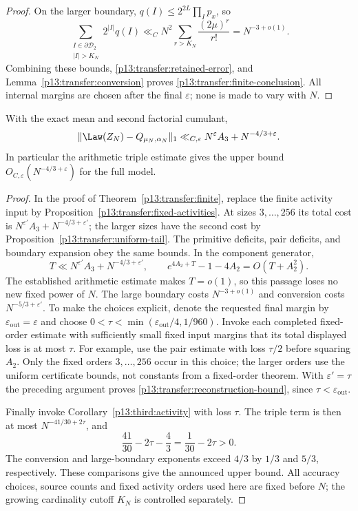 \begin{proof}
On the larger boundary, $q(I)\leq2^{2L}\prod_Ip_x$, so
\[
 \sum_{\substack{I\in\partial\mathscr D_2\\|I|>K_N}}2^{|I|}q(I)
 \ll_C N^2\sum_{r>K_N}\frac{(2\mu)^r}{r!}=N^{-3+o(1)}.
\]
Combining these bounds, \eqref{p13:transfer:retained-error}, and
Lemma~\ref{p13:transfer:conversion} proves
\eqref{p13:transfer:finite-conclusion}. All internal margins are chosen
after the final $\varepsilon$; none is made to vary with $N$.
\end{proof}

\begin{theorem}
\label{p13:transfer:reconstruction}
With the exact mean and second factorial cumulant,
\begin{equation}
 \|\Law(Z_N)-Q_{\mu_N,\alpha_N}\|_1
       \ll_{C,\varepsilon}N^\varepsilon A_3+N^{-4/3+\varepsilon}.
 \label{p13:transfer:reconstruction-bound}
\end{equation}
In particular the arithmetic triple estimate gives the upper bound
$O_{C,\varepsilon}(N^{-4/3+\varepsilon})$ for the full model.
\end{theorem}

\begin{proof}
In the proof of Theorem~\ref{p13:transfer:finite}, replace the finite
activity input by Proposition~\ref{p13:transfer:fixed-activities}.
At sizes $3,\ldots,256$ its total cost is
$N^{\varepsilon'}A_3+N^{-4/3+\varepsilon'}$; the larger sizes have the
second cost by Proposition~\ref{p13:transfer:uniform-tail}.
The primitive deficits, pair deficits, and boundary expansion obey
the same bounds. In the component generator,
\[
 T\ll N^{\varepsilon'}A_3+N^{-4/3+\varepsilon'},\qquad
 e^{4A_2+T}-1-4A_2=O(T+A_2^2).
\]
The established arithmetic estimate makes $T=o(1)$, so this passage
loses no new fixed power of $N$. The large boundary costs $N^{-3+o(1)}$
and conversion costs $N^{-5/3+\varepsilon'}$.
To make the choices explicit, denote the requested final margin by
$\varepsilon_{\mathrm{out}}=\varepsilon$ and choose
$0<\tau<\min(\varepsilon_{\mathrm{out}}/4,1/960)$.
Invoke each completed fixed-order estimate with sufficiently small fixed
input margins that its total displayed loss is at most $\tau$.
For example, use the pair estimate with loss $\tau/2$ before squaring
$A_2$. Only the fixed orders $3,\ldots,256$ occur in this choice;
the larger orders use the uniform certificate bounds, not constants
from a fixed-order theorem. With $\varepsilon'=\tau$ the preceding
argument proves \eqref{p13:transfer:reconstruction-bound}, since
$\tau<\varepsilon_{\mathrm{out}}$.

Finally invoke Corollary~\ref{p13:third:activity} with loss $\tau$.
The triple term is then at most $N^{-41/30+2\tau}$, and
\[
 \frac{41}{30}-2\tau-\frac43=\frac1{30}-2\tau>0.
\]
The conversion and large-boundary exponents exceed $4/3$ by $1/3$
and $5/3$, respectively. These comparisons give the announced upper
bound. All accuracy choices, source counts and fixed activity orders used here
are fixed before $N$; the growing cardinality cutoff $K_N$ is controlled
separately.
\end{proof}

